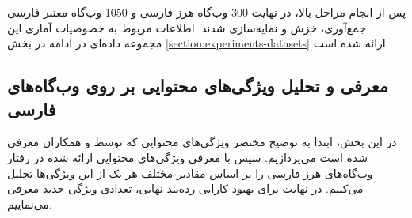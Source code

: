\documentclass[twoside, a4paper,11pt]{book}
\numberwithin{equation}{chapter}
\numberwithin{table}{chapter}
\numberwithin{figure}{chapter}
\numberwithin{equation}{chapter}
\begin{document}
پس از انجام مراحل بالا، در نهایت 300 وب‌گاه هرز فارسی و 1050 وب‌گاه معتبر فارسی جمع‌آوری، خزش و نمایه‌سازی شدند. اطلاعات مربوط به خصوصیات آماری این مجموعه داده‌ای در ادامه در بخش \ref{section:experiments-datasets}  ارائه شده است. 

\subsection{معرفی و تحلیل ویژگی‌های محتوایی بر روی وب‌گاه‌های فارسی}
\label{section:methodology-structuralcontentbased}
در این بخش، ابتدا به توضیح مختصر ویژگی‌های محتوایی که توسط  و همکاران \cite{Ntoulas:2006} معرفی شده است می‌پردازیم. سپس با معرفی ویژگی‌های محتوایی ارائه شده در \cite{Fetterly:2004, Prieto:2013, Urvoy:2008tracking} رفتار وب‌گاه‌های هرز فارسی را بر اساس مقادیر مختلف هر یک از این ویژگی‌ها تحلیل می‌کنیم. در نهایت برای بهبود کارایی رده‌بند نهایی، تعدادی ویژگی جدید معرفی می‌نماییم.
\end{document}
